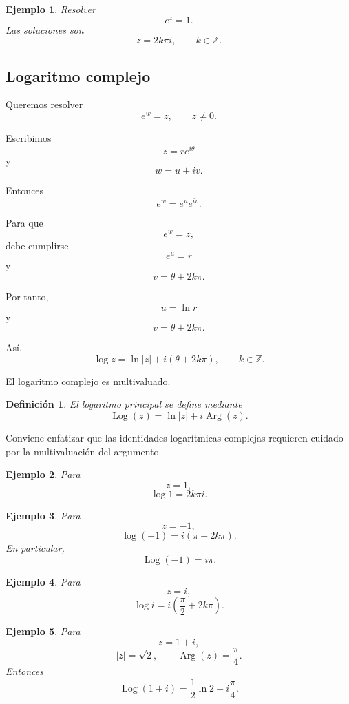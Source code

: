 \documentclass[12pt]{article}
\newtheorem{Ejem}{Ejemplo}
\newtheorem{Def}{Definici\'on}
\begin{document}
\begin{Ejem}
Resolver
\[
e^z=1.
\]
Las soluciones son
\[
\boxed{z=2k\pi i,\qquad k\in\mathbb{Z}.}
\]
\end{Ejem}




\subsection*{Logaritmo complejo}

Queremos resolver
\[
e^w=z,
\qquad
z\neq0.
\]

Escribimos
\[
z=re^{i\theta}
\]
y
\[
w=u+iv.
\]

Entonces
\[
e^w
=
e^u e^{iv}.
\]

Para que
\[
e^w=z,
\]
debe cumplirse
\[
e^u=r
\]
y
\[
v=\theta+2k\pi.
\]

Por tanto,
\[
u=\ln r
\]
y
\[
v=\theta+2k\pi.
\]

Así,
\[
\boxed{
\log z
=
\ln|z|
+
i(\theta+2k\pi),
\qquad
k\in\mathbb{Z}.
}
\]

El logaritmo complejo es multivaluado.


\begin{Def}

El \emph{logaritmo principal} se define mediante
\[
\boxed{
\operatorname{Log}(z)
=
\ln|z|
+
i\operatorname{Arg}(z).
}
\]
\end{Def}

Conviene enfatizar que las identidades logarítmicas complejas requieren
cuidado por la multivaluación del argumento.


\begin{Ejem}

Para
\[
z=1,
\]
\[
\log 1=2k\pi i.
\]
\end{Ejem}


\begin{Ejem}
Para
\[
z=-1,
\]
\[
\log(-1)=i(\pi+2k\pi).
\]
En particular,
\[
\operatorname{Log}(-1)=i\pi.
\]

\end{Ejem}


\begin{Ejem}
Para
\[
z=i,
\]
\[
\log i=i\left(\frac{\pi}{2}+2k\pi\right).
\]

\end{Ejem}


\begin{Ejem}
Para
\[
z=1+i,
\]
\[
|z|=\sqrt2,
\qquad
\operatorname{Arg}(z)=\frac{\pi}{4}.
\]
Entonces
\[
\operatorname{Log}(1+i)=\frac12\ln2+i\frac{\pi}{4}.
\]

\end{Ejem}
\end{document}
